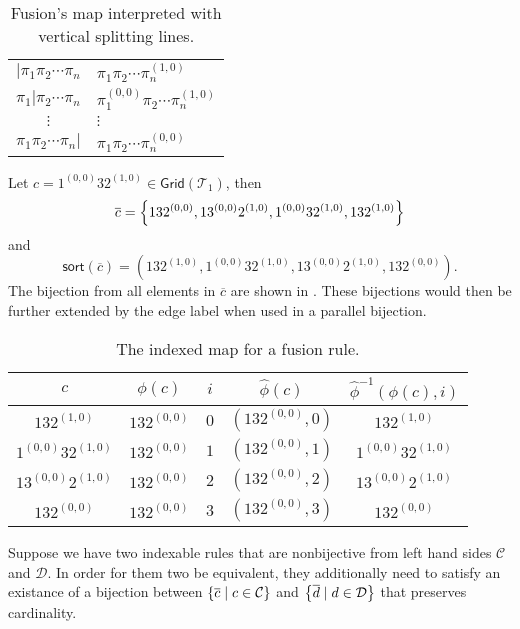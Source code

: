\begin{table}[ht!]
    \centering
    \begin{tabular}{c|l}
        $|\pi_1\pi_2\dotsm\pi_n$ & $\pi_1\pi_2\dotsm\pi_n^{(1,0)}$ \\
        $\pi_1|\pi_2\dotsm\pi_n$ & $\pi_1^{(0,0)}\pi_2\dotsm\pi_n^{(1,0)}$ \\
        $\vdots$ & \hspace{1cm}$\vdots$ \\
        $\pi_1\pi_2\dotsm\pi_n|$ & $\pi_1\pi_2\dotsm\pi_n^{(0,0)}$ \\
    \end{tabular}
    \caption{Fusion's map interpreted with vertical splitting lines.}
    \label{tab:fuseline}
\end{table}

Let $c = 1^{(0,0)}32^{(1,0)} \in \textsf{Grid}(\mathcal{T}_1)$, then
\[
    \overline{c} = \left\{132^{(0,0)},13^{(0,0)}2^{(1,0)}, 1^{(0,0)}32^{(1,0)}, 132^{(1,0)}\right\}
\]
and 
\[
    \textsf{sort}(\overline{c}) = \left(132^{(1,0)},1^{(0,0)}32^{(1,0)},13^{(0,0)}2^{(1,0)},132^{(0,0)}\right).
\]
The bijection from all elements in $\overline{c}$ are shown in . These bijections would then be further extended by the edge label when used in a parallel bijection.

\begin{table}[ht!]
    \centering
    \begin{tabular}{c|c|c|c|c}
        $c$ & $\phi(c)$ & $i$ & $\hat{\phi}(c)$ & $\hat{\phi}^{-1}(\phi(c),i)$\\
        \hline
        $132^{(1,0)}$ & $132^{(0,0)}$ & $0$ & $\left(132^{(0,0)}, 0\right)$ & $132^{(1,0)}$ \\
        $1^{(0,0)}32^{(1,0)}$ & $132^{(0,0)}$ & $1$ & $\left(132^{(0,0)}, 1\right)$ & $1^{(0,0)}32^{(1,0)}$ \\
        $13^{(0,0)}2^{(1,0)}$ & $132^{(0,0)}$ & $2$ & $\left(132^{(0,0)}, 2\right)$ & $13^{(0,0)}2^{(1,0)}$\\
        $132^{(0,0)}$ & $132^{(0,0)}$ & $3$ & $\left(132^{(0,0)}, 3\right)$ & $132^{(0,0)}$
    \end{tabular}
    \caption{The indexed map for a fusion rule.}
    \label{tab:fuseidxmap}
\end{table}

Suppose we have two indexable rules that are nonbijective from left hand sides $\mathcal{C}$ and $\mathcal{D}$. In order for them two be equivalent, they additionally need to satisfy an existance of a bijection between $\left\{\overline{c} \mid c \in \mathcal{C}\right\}$ and $\left\{\overline{d} \mid d \in \mathcal{D}\right\}$ that preserves cardinality.

